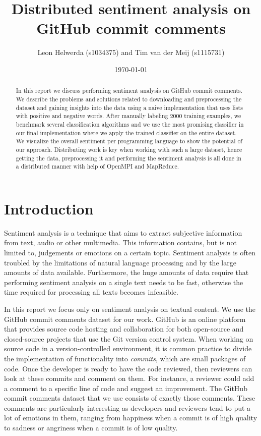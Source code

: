 \documentclass{article}
\begin{document}
\title{Distributed sentiment analysis on GitHub commit comments}
\author{Leon Helwerda (s1034375) and Tim van der Meij (s1115731)}
\date{\today}
\maketitle

\begin{abstract}
  In this report we discuss performing sentiment analysis on GitHub commit
  comments. We describe the problems and solutions related to downloading and
  preprocessing the dataset and gaining insights into the data using a naive
  implementation that uses lists with positive and negative words. After
  manually labeling 2000 training examples, we benchmark several classification
  algorithms and we use the most promising classifier in our final
  implementation where we apply the trained classifier on the entire dataset.
  We visualize the overall sentiment per programming language to show the
  potential of our approach. Distributing work is key when working with such a
  large dataset, hence getting the data, preprocessing it and performing the
  sentiment analysis is all done in a distributed manner with help of OpenMPI
  and MapReduce.
\end{abstract}

\section{Introduction}\label{sec:introduction}
Sentiment analysis is a technique that aims to extract subjective information
from text, audio or other multimedia. This information contains, but is not
limited to, judgements or emotions on a certain topic. Sentiment analysis is
often troubled by the limitations of natural language processing and by the
large amounts of data available. Furthermore, the huge amounts of data require
that performing sentiment analysis on a single text needs to be fast, otherwise
the time required for processing all texts becomes infeasible.

In this report we focus only on sentiment analysis on textual content. We use the
GitHub commit comments dataset for our work. GitHub is an online platform that
provides source code hosting and collaboration for both open-source and
closed-source projects that use the Git version control system. When working on
source code in a version-controlled environment, it is common practice to divide the
implementation of functionality into \emph{commits}, which are small packages of
code. Once the developer is ready to have the code reviewed, then reviewers can
look at these commits and comment on them. For instance, a reviewer could add a
comment to a specific line of code and suggest an improvement. The GitHub commit
comments dataset that we use consists of exactly those comments. These comments
are particularly interesting as developers and reviewers tend to put a lot of
emotions in them, ranging from happiness when a commit is of high quality to
sadness or angriness when a commit is of low quality.
\end{document}
